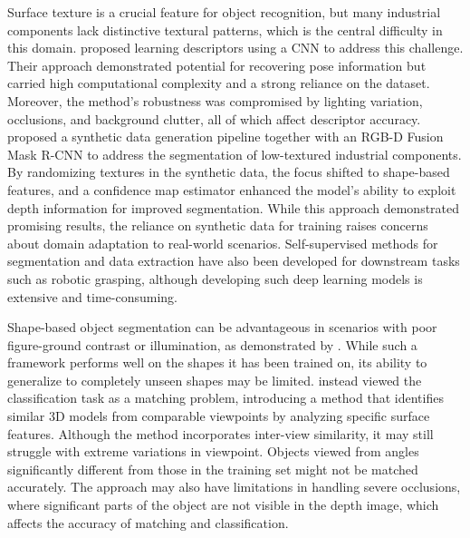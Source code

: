 Surface texture is a crucial feature for object recognition, but many industrial components lack
distinctive textural patterns, which is the central difficulty in this domain.
\citet{wohlhart2015learning} proposed learning descriptors using a CNN to address this challenge.
Their approach demonstrated potential for recovering pose information but carried high computational
complexity and a strong reliance on the dataset. Moreover, the method's robustness was compromised
by lighting variation, occlusions, and background clutter, all of which affect descriptor
accuracy. \citet{back2020segmenting} proposed a synthetic data generation pipeline together with an RGB-D Fusion Mask R-CNN to address the segmentation of low-textured industrial components. By randomizing textures in the synthetic data, the focus shifted to shape-based features, and a confidence map estimator enhanced the model's ability to exploit depth information for improved segmentation. While this approach demonstrated promising results, the reliance on synthetic data for training raises concerns about domain adaptation to real-world scenarios. Self-supervised methods for segmentation and data extraction have also been developed for downstream tasks such as robotic grasping, although developing such deep learning models is extensive and time-consuming.

Shape-based object segmentation can be advantageous in scenarios with poor figure-ground contrast or
illumination, as demonstrated by \citet{borenstein2006shape}. While such a framework performs well
on the shapes it has been trained on, its ability to generalize to completely unseen shapes may be
limited. \citet{wohlkinger2011shape} instead viewed the classification task as a matching problem,
introducing a method that identifies similar 3D models from comparable viewpoints by analyzing
specific surface features. Although the method incorporates inter-view similarity, it may still
struggle with extreme variations in viewpoint. Objects viewed from angles significantly different
from those in the training set might not be matched accurately. The approach may also have
limitations in handling severe occlusions, where significant parts of the object are not visible in
the depth image, which affects the accuracy of matching and classification.

